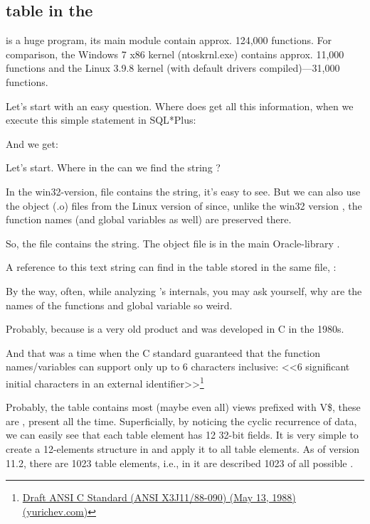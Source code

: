 \subsection{ table in the \oracle}

\myindex{\oracle}
 is a huge program, its main module  contain approx. 124,000 functions. For comparison, the Windows 7 x86 kernel (ntoskrnl.exe) contains approx. 11,000 functions and the Linux 3.9.8 kernel
(with default drivers compiled)---31,000 functions.

Let's start with an easy question. Where does \oracle get all this information, when we execute this simple statement in SQL*Plus:



And we get:



Let's start. Where in the \oracle can we find the string ?

In the win32-version,  file contains the string,
it's easy to see.
But we can also use the object (.o) files from the Linux version of \oracle since, unlike the win32 version , the function names (and global variables as well) are preserved there.

So, the  file contains the  string.
The object file is in the main Oracle-library .

A reference to this text string can find in the  table stored in the same file, :



By the way, often, while analyzing \oracle's internals, you may ask yourself, why are the names of the functions and global variable so weird.

Probably, because \oracle is a very old product and was developed in C in the 1980s.

And that was a time when the C standard guaranteed that the function names/variables can support only up to 6 characters inclusive: <<6 significant initial characters in an external identifier>>\footnote{\href{http://go.yurichev.com/17142}{Draft ANSI C Standard (ANSI X3J11/88-090) (May 13, 1988) (yurichev.com)}}

Probably, the table  contains most (maybe even all) views prefixed with V\$, these are , present all the time.
Superficially, by noticing the cyclic recurrence of data, we can easily see that each  table element has 12 32-bit fields.
It is very simple to create a 12-elements structure in \IDA and apply it to all table elements.
As of \oracle version 11.2, there are 1023 table elements, i.e., in it are described 1023 of all possible .

